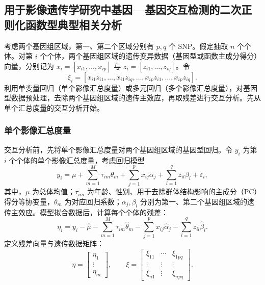 \subsection{用于影像遗传学研究中基因—基因交互检测的二次正则化函数型典型相关分析}

考虑两个基因组区域，第一、第二个区域分别有 $p,q$ 个 SNP。假定抽取 $n$ 个个体。对第 $i$ 个个体，两个基因组区域的遗传变异数据（基因型或函数主成分得分）向量，分别记为 $x_i=[x_{i1},\ldots,x_{ip}]$ 与 $z_i=[z_{i1},\ldots,z_{iq}]$。令
\[
\xi_i=[x_{i1}z_{i1},\ldots,x_{i1}z_{iq},\ldots,x_{ip}z_{i1},\ldots,x_{ip}z_{iq}].
\]
利用单变量回归（单个影像汇总度量）或多元回归（多个影像汇总度量），对基因型数据预处理，去除两个基因组区域的遗传主效应，再取残差进行交互分析。先从单个汇总度量的交互分析开始。

\subsubsection{单个影像汇总度量}

交互分析前，先将单个影像汇总度量对两个基因组区域的基因型回归。令 $y_i$ 为第 $i$ 个个体的单个影像汇总度量，考虑回归模型
\begin{equation}
y_i=\mu+\sum_{m=1}^M\tau_{im}\theta_m+\sum_{j=1}^px_{ij}\alpha_j+\sum_{l=1}^qz_{il}\beta_l+\varepsilon_i,
\tag{6.190}
\end{equation}
其中，$\mu$ 为总体均值；$\tau_{im}$ 为年龄、性别、用于去除群体结构影响的主成分（PC）得分等协变量，$\theta_m$ 为对应回归系数；$\alpha_j,\beta_l$ 分别为第一、第二个基因组区域的遗传主效应。模型拟合数据后，计算每个个体的残差：
\begin{equation}
\eta_i=y_i-\widehat\mu-\sum_{m=1}^M\tau_{im}\widehat\theta_m-\sum_{j=1}^px_{ij}\widehat\alpha_j-\sum_{l=1}^qz_{il}\widehat\beta_l.
\tag{6.191}
\end{equation}
定义残差向量与遗传数据矩阵：
\begin{equation}
\eta=\begin{bmatrix}\eta_1\\\vdots\\\eta_m\end{bmatrix},\qquad
\xi=\begin{bmatrix}\xi_{11}&\cdots&\xi_{1pq}\\\vdots&\vdots&\vdots\\\xi_{n1}&\vdots&\xi_{npq}\end{bmatrix}.
\tag{6.192}
\end{equation}

